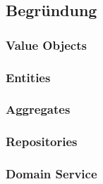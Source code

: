 		\subsection{Begründung}
		
			\subsubsection{Value Objects}
			
			\subsubsection{Entities}
			
			\subsubsection{Aggregates}
			
			\subsubsection{Repositories}
			
			\subsubsection{Domain Service}